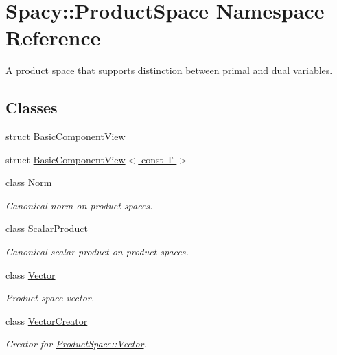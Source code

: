 \hypertarget{namespaceSpacy_1_1ProductSpace}{}\section{Spacy\+:\+:Product\+Space Namespace Reference}
\label{namespaceSpacy_1_1ProductSpace}


A product space that supports distinction between primal and dual variables.  


\subsection*{Classes}
\begin{DoxyCompactItemize}
\item 
struct \hyperlink{structSpacy_1_1ProductSpace_1_1BasicComponentView}{Basic\+Component\+View}
\item 
struct \hyperlink{structSpacy_1_1ProductSpace_1_1BasicComponentView_3_01const_01T_01_4}{Basic\+Component\+View$<$ const T $>$}
\item 
class \hyperlink{classSpacy_1_1ProductSpace_1_1Norm}{Norm}
\begin{DoxyCompactList}\small\item\em Canonical norm on product spaces. \end{DoxyCompactList}\item 
class \hyperlink{classSpacy_1_1ProductSpace_1_1ScalarProduct}{Scalar\+Product}
\begin{DoxyCompactList}\small\item\em Canonical scalar product on product spaces. \end{DoxyCompactList}\item 
class \hyperlink{classSpacy_1_1ProductSpace_1_1Vector}{Vector}
\begin{DoxyCompactList}\small\item\em Product space vector. \end{DoxyCompactList}\item 
class \hyperlink{classSpacy_1_1ProductSpace_1_1VectorCreator}{Vector\+Creator}
\begin{DoxyCompactList}\small\item\em Creator for \hyperlink{classSpacy_1_1ProductSpace_1_1Vector}{Product\+Space\+::\+Vector}. \end{DoxyCompactList}\end{DoxyCompactItemize}
